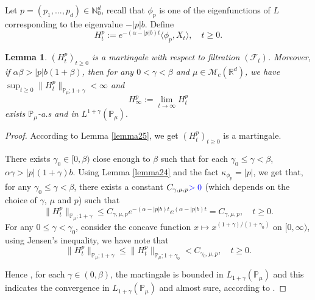 \documentclass[12pt,oneside,english]{amsart}
\theoremstyle{plain}
\newtheorem{lem}[thm]{Lemma}
\theoremstyle{definition}
\numberwithin{equation}{section}
\newcommand{\added}[1]{{\color{blue}#1}}\newcommand{\deleted}[1]{{\color{red}#1}}
\begin{document}
    Let $p=(p_1,...,p_d)\in \mathbb N_0^d$, recall that $\phi_p$ is one of the eigenfunctions of $L$ corresponding to the eigenvalue $-|p|b$. Define
$$H_t^p:=e^{-(\alpha-|p|b)t}\langle\phi_p,X_t\rangle, \quad t\geq 0.$$

\begin{lem}\label{lemma26}
    $(H^p_t)_{t\geq 0}$ is a martingale with respect to filtration $(\mathscr F_t)$.
    Moreover, if $\alpha\beta>|p|b(1+\beta)$, then for any $0< \gamma<\beta$ and $\mu \in \mathcal M_c(\mathbb R^d)$, we have $\sup_{t\geq 0}\|H_t^p\|_{\mathbb P_\mu;1+\gamma}< \infty$ and
$$H_{\infty}^p:=\lim_{t\rightarrow \infty}H_t^p$$
exists $\mathbb{P}_{\mu}$-a.s and in $L^{1+\gamma}(\mathbb{P}_{\mu}).$
\end{lem}
\begin{proof}
    According to Lemma \ref{lemma25}, we get $(H_t^p)_{t\geq 0}$ is a martingale.

    There exists $\gamma_0 \in [0,\beta)$ close enough to $\beta$ such that for each $\gamma_0 \leq \gamma < \beta$, $\alpha\gamma>|p|(1+\gamma)b$.
    Using  Lemma \ref{lemma24} and the fact $\kappa_{\phi_p}=|p|$, we get that, \deleted{for any $\gamma_0\leq\gamma<\beta$,} there exists a constant $C_{\gamma, \mu, p} \added{>0}$ \added{(which depends on the choice of $\gamma$, $\mu$ and $p$)}  such that
 \added{
 $$
 	\|H_t^p\|_{\mathbb P_\mu;1+\gamma}
    \leq C_{\gamma, \mu, p} e^{-(\alpha-|p|b)t}e^{(\alpha-|p|b)t}
    =C_{\gamma, \mu, p}, \quad t\geq 0.
 $$
 }
    For any $0\leq\gamma<\gamma_0$, \deleted{consider the concave function $x\mapsto x^{(1+\gamma)/(1+\gamma_0)}$ on $[0,\infty)$, using Jensen's inequality, we have} \added{note that}
\added{
$$
	\|H_t^p\|_{\mathbb P_\mu;1+\gamma}
	\leq\|H_t^p\|_{\mathbb P_\mu;1+\gamma_0}
	<C_{\gamma_0, \mu, p},
	\quad t\geq 0.
$$
}

    Hence \added{, for each $\gamma \in (0,\beta)$,} the martingale is bounded in $L_{1+\gamma}(\mathbb{P}_{\mu})$ and this indicate\added{s} the convergence in $L_{1+\gamma}(\mathbb{P}_{\mu}) $ and almost sure,
    according to \cite[Theorem 5.4.5]{Durrett2010Probability}.
\end{proof}
\end{document}
